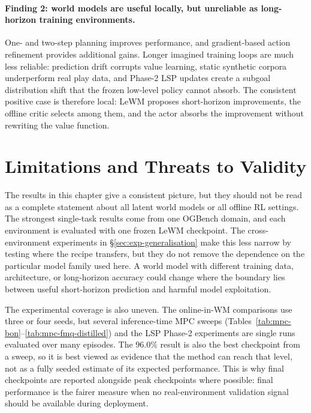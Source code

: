 \paragraph{Finding 2: world models are useful locally, but unreliable
as long-horizon training environments.}
One- and two-step planning improves performance, and gradient-based
action refinement provides additional gains. Longer imagined training
loops are much less reliable: prediction drift corrupts value learning,
static synthetic corpora underperform real play data, and Phase-2 LSP
updates create a subgoal distribution shift that the frozen low-level
policy cannot absorb. The consistent positive case is therefore local:
LeWM proposes short-horizon improvements, the offline critic selects
among them, and the actor absorbs the improvement without rewriting the
value function.

\section{Limitations and Threats to Validity}
\label{sec:exp-threats}

The results in this chapter give a consistent picture, but they should
not be read as a complete statement about all latent world models or all
offline RL settings. The strongest single-task results come from one
OGBench domain, and each environment is evaluated with one frozen LeWM
checkpoint. The cross-environment experiments in
\S\ref{sec:exp-generalisation} make this less narrow by testing where
the recipe transfers, but they do not remove the dependence on the
particular model family used here. A world model with different training
data, architecture, or long-horizon accuracy could change where the
boundary lies between useful short-horizon prediction and harmful model
exploitation.

The experimental coverage is also uneven. The online-in-WM comparisons
use three or four seeds, but several inference-time MPC sweeps
(Tables~\ref{tab:mpc-bon}--\ref{tab:mpc-fmq-distilled}) and the LSP
Phase-2 experiments are single runs evaluated over many episodes. The
$96.0\%$ result is also the best checkpoint from a sweep, so it is best
viewed as evidence that the method can reach that level, not as a fully
seeded estimate of its expected performance. This is why final
checkpoints are reported alongside peak checkpoints where possible:
final performance is the fairer measure when no real-environment
validation signal should be available during deployment.

